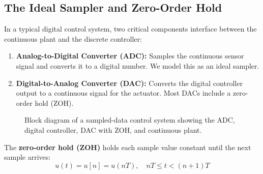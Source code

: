 \subsection{The Ideal Sampler and Zero-Order Hold}

In a typical digital control system, two critical components interface between the continuous plant and the discrete controller:

\begin{enumerate}
    \item \textbf{Analog-to-Digital Converter (ADC):} Samples the continuous sensor signal and converts it to a digital number. We model this as an ideal sampler.

    \item \textbf{Digital-to-Analog Converter (DAC):} Converts the digital controller output to a continuous signal for the actuator. Most DACs include a zero-order hold (ZOH).
\end{enumerate}

\begin{figure}[htbp]
\centering
{}
\caption{Block diagram of a sampled-data control system showing the ADC, digital controller, DAC with ZOH, and continuous plant.}
\label{fig:sampled_data_system}
\end{figure}

The \textbf{zero-order hold (ZOH)} holds each sample value constant until the next sample arrives:
\begin{equation}
u(t) = u[n] = u(nT), \quad nT \leq t < (n+1)T
\end{equation}

